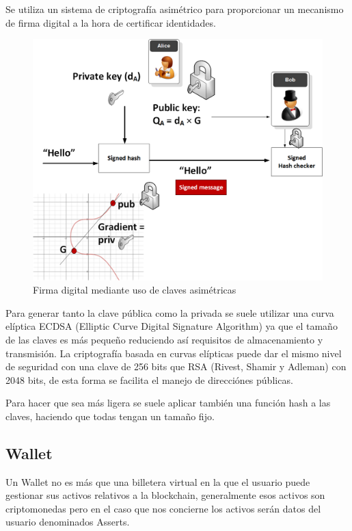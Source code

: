 \documentclass[12pt]{report}
\begin{document}
\begin{itemize}
Se utiliza un sistema de criptografía asimétrico para proporcionar un mecanismo de firma digital a la hora de certificar identidades.
\begin{figure}
\includegraphics[scale=0.3]{digital-sign}
\caption{Firma digital mediante uso de claves asimétricas}
\end{figure}

Para generar tanto la clave pública como la privada se suele utilizar una curva elíptica ECDSA (Elliptic Curve Digital Signature Algorithm) ya que el tamaño de las claves es más pequeño reduciendo así requisitos de almacenamiento y transmisión. La criptografía basada en curvas elípticas puede dar el mismo nivel de seguridad con una clave de 256 bits que RSA (Rivest, Shamir y Adleman) con 2048 bits, de esta forma se facilita el manejo de direcciónes públicas.

Para hacer que sea más ligera se suele aplicar también una función hash a las claves, haciendo que todas tengan un tamaño fijo.
\end{itemize}
\subsection{Wallet}

Un Wallet no es más que una billetera virtual en la que el usuario puede gestionar sus activos relativos a la blockchain, generalmente esos activos son criptomonedas pero en el caso que nos concierne los activos serán datos del usuario denominados Asserts.
\end{document}
